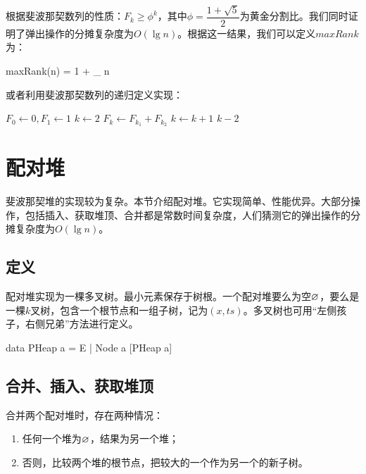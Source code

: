 \documentclass[b5paper]{ctexart}
\begin{document}
根据斐波那契数列的性质：$F_k \geq \phi^k$，其中$\phi = \dfrac{1+\sqrt{5}}{2}$为黄金分割比。我们同时证明了弹出操作的分摊复杂度为$O(\lg n)$。根据这一结果，我们可以定义$maxRank$为：

\be
  maxRank(n) = 1 + \lfloor \log_{\phi} n \rfloor
\ee

或者利用斐波那契数列的递归定义实现：

\begin{algorithmic}[1]
  \State $F_0 \gets 0, F_1 \gets 1$
  \State $k \gets 2$
  \Repeat
    \State $F_k \gets F_{k_1} + F_{k_2}$
    \State $k \gets k + 1$
  \State \Return $k - 2$
\EndFunction
\end{algorithmic}

\section{配对堆}
\label{pairing-heap} 

斐波那契堆的实现较为复杂。本节介绍配对堆。它实现简单、性能优异。大部分操作，包括插入、获取堆顶、合并都是常数时间复杂度，人们猜测它的弹出操作的分摊复杂度为$O(\lg n)$\cite{pairing-heap}\cite{okasaki-book}。

\subsection{定义}

配对堆实现为一棵多叉树。最小元素保存于树根。一个配对堆要么为空$\varnothing$，要么是一棵$k$叉树，包含一个根节点和一组子树，记为$(x, ts)$。多叉树也可用“左侧孩子，右侧兄弟”方法进行定义。

\begin{Haskell}
data PHeap a = E | Node a [PHeap a]
\end{Haskell}

\subsection{合并、插入、获取堆顶}
 

合并两个配对堆时，存在两种情况：

\begin{enumerate}
\item 任何一个堆为$\varnothing$，结果为另一个堆；
\item 否则，比较两个堆的根节点，把较大的一个作为另一个的新子树。
\end{enumerate}
\end{document}
